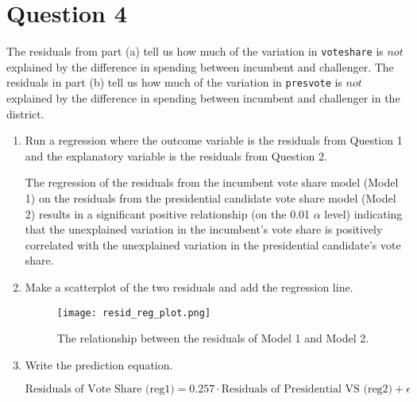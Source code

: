 \documentclass[12pt,letterpaper]{article}
\begin{document}
\section*{Question 4}
\noindent The residuals from part (a) tell us how much of the variation in \texttt{voteshare} is $not$ explained by the difference in spending between incumbent and challenger. The residuals in part (b) tell us how much of the variation in \texttt{presvote} is $not$ explained by the difference in spending between incumbent and challenger in the district.
	\begin{enumerate}
		\item Run a regression where the outcome variable is the residuals from Question 1 and the explanatory variable is the residuals from Question 2.	
	
		
		
		
		The regression of the residuals from the incumbent vote share model (Model 1) on the residuals from the presidential candidate vote share model (Model 2) results in a significant positive relationship (on the 0.01 $\alpha$ level) indicating that the unexplained variation in the incumbent’s vote share is positively correlated with the unexplained variation in the presidential candidate’s vote share. 
		
		\item Make a scatterplot of the two residuals and add the regression line. 
	
		
		\begin{figure}[H]
			\centering
			\texttt{[image: resid\_reg\_plot.png]}
			\caption{The relationship between the residuals of Model 1 and Model 2.}
		\end{figure}		
		
		\item Write the prediction equation.
		
		\begin{equation*}
			\text{Residuals of Vote Share (reg1)} = 0.257 \cdot \text{Residuals of Presidential VS 	(reg2)} + \epsilon
		\end{equation*}
		
	\end{enumerate}
	
	\newpage	
\end{document}
